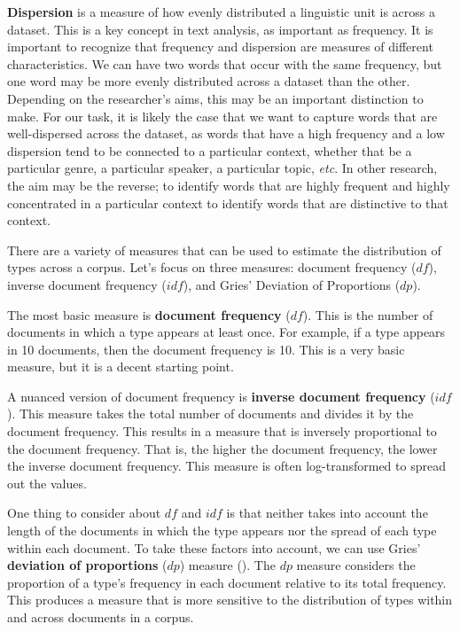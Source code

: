 \documentclass[
  letterpaper,
  krantz1]{latex/krantz-mod}
\theoremstyle{definition}
\theoremstyle{definition}
\theoremstyle{remark}
\begin{document}
\textbf{Dispersion} is a measure of how evenly distributed a linguistic
unit is across a dataset. This is a key concept in
text analysis, as important as frequency. It is important to recognize
that frequency and dispersion are measures of different characteristics.
We can have two words that occur with the same frequency, but one word
may be more evenly distributed across a dataset than the other.
Depending on the researcher's aims, this may be an important distinction
to make. For our task, it is likely the case that we want to capture
words that are well-dispersed across the dataset, as words that have a
high frequency and a low dispersion tend to be connected to a particular
context, whether that be a particular genre, a particular speaker, a
particular topic, \emph{etc}. In other research, the aim may be the
reverse; to identify words that are highly frequent and highly
concentrated in a particular context to identify words that are
distinctive to that context.

There are a variety of measures that can be used to estimate the
distribution of types across a corpus. Let's focus on three measures:
document frequency (\(df\)), inverse document frequency (\(idf\)), and
Gries' Deviation of Proportions (\(dp\)).

The most basic measure is \textbf{document frequency}
(\(df\)). This is the number of documents in
which a type appears at least once. For example, if a type appears in 10
documents, then the document frequency is 10. This is a very basic
measure, but it is a decent starting point.

A nuanced version of document frequency is \textbf{inverse document
frequency} (\(idf\)). This measure
takes the total number of documents and divides it by the document
frequency. This results in a measure that is inversely proportional to
the document frequency. That is, the higher the document frequency, the
lower the inverse document frequency. This measure is often
log-transformed to spread out the values.

One thing to consider about \(df\) and \(idf\) is that neither takes
into account the length of the documents in which the type appears nor
the spread of each type within each document. To take these factors into
account, we can use Gries' \textbf{deviation of proportions} (\(dp\))
measure (). The \(dp\) measure
considers the proportion of a type's frequency in each document relative
to its total frequency. This produces a measure that is more sensitive
to the distribution of types within and across documents in a corpus.
\end{document}
